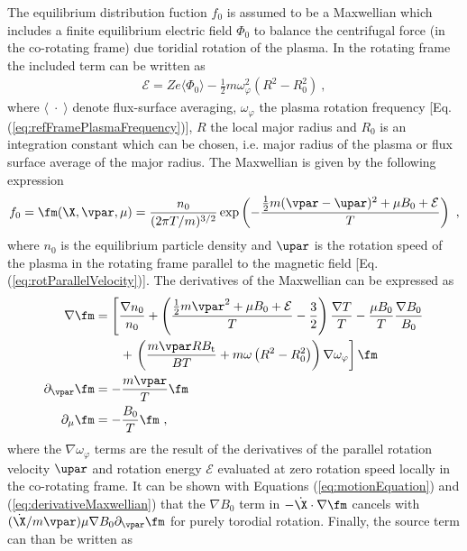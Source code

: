 The equilibrium distribution fuction $f_0$ is assumed to be a Maxwellian which includes a finite equilibrium electric field $\Phi_0$ to balance the centrifugal force (in the co-rotating frame) due toridial rotation of the plasma. In the rotating frame the included term can be written as\source
\begin{gather}
	\mathcal{E} = Z e \langle \Phi_0 \rangle - \frac{1}{2} m \omega_\varphi^2 \left(R^2 - R_0^2\right)~,
	\label{eq:rotEnergy}
\end{gather}
where $\langle\;\cdot\;\rangle$ denote flux-surface averaging, $\omega_\varphi$ the plasma rotation frequency [Eq. (\ref{eq:refFramePlasmaFrequency})], $R$ the local major radius and $R_0$ is an integration constant which can be chosen, i.e. major radius of the plasma or flux surface average of the major radius\source. The Maxwellian is given by the following expression
\begin{gather}
	f_0 = \fm(\X, \vpar, \mu) = \frac{n_0}{(2\pi T/m)^{3/2}}\exp\left(-\frac{\frac{1}{2} m (\vpar - \upar)^2 + \mu B_0 + \mathcal{E}}{T}\right)~,
	\label{eq:maxwellian}
\end{gather}   
where $n_0$ is the equilibrium particle density and $\upar$ is the rotation speed of the plasma in the rotating frame parallel to the magnetic field [Eq. (\ref{eq:rotParallelVelocity})]. The derivatives of the Maxwellian can be expressed as\source 
\begin{gather}
	\begin{aligned}
		\nabla \fm           &= \left[\frac{\nabla n_0}{n_0} + \left(\frac{\frac{1}{2} m \vpar^2 + \mu B_0 + \mathcal{E}}{T} - \frac{3}{2}\right)\frac{\nabla T}{T} - \frac{\mu B_0}{T} \frac{\nabla B_0}{B_0} \right. \\ 
		&\qquad + \left. \left(\frac{m \vpar R B_\mathrm{t}}{BT} + m\omega \left(R^2 - R_0^2\right)\right) \nabla \omega_\varphi\right] \fm \\
		\partial_{\vpar} \fm &= - \frac{m \vpar}{T} \fm \\
		\partial_\mu \fm     &= - \frac{B_0}{T} \fm ~,  
	\end{aligned}
	\label{eq:derivativeMaxwellian}
\end{gather} 
where the $\nabla \omega_\varphi$ terms are the result of the derivatives of the parallel rotation velocity $\upar$ and rotation energy $\mathcal{E}$ evaluated at zero rotation speed locally in the co-rotating frame. It can be shown with Equations (\ref{eq:motionEquation}) and (\ref{eq:derivativeMaxwellian}) that the $\nabla B_0$ term in $-\dot{\X}\cdot \nabla \fm$ cancels with $(\dot{\X}/m \vpar) \mu \nabla B_0 \partial_{\vpar} \fm$ for purely torodial rotation. Finally, the source term can than be written as 
